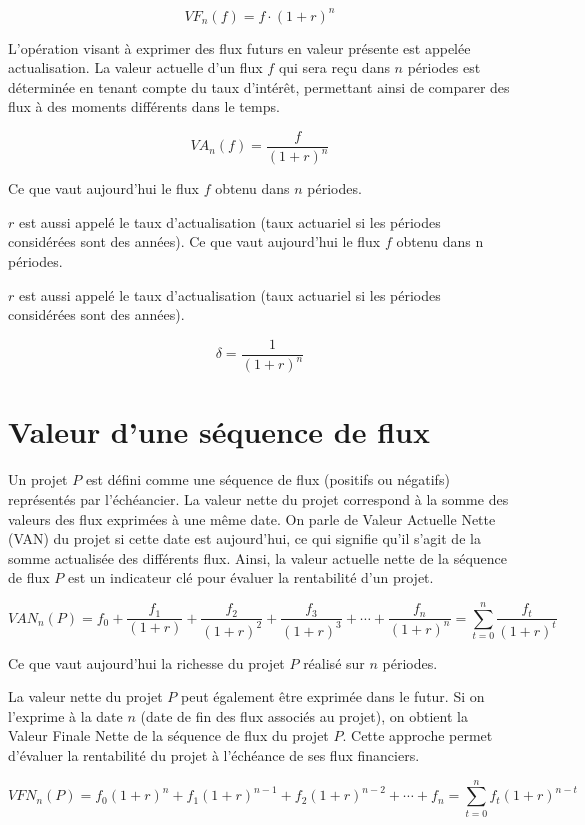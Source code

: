 \documentclass[a4paper, 12pt]{report}
\begin{document}
\[ VF_n(f)=f\cdot(1+r)^n \]

L'opération visant à exprimer des flux futurs en valeur présente est appelée actualisation. La valeur actuelle d'un flux \( f \) qui sera reçu dans \( n \) périodes est déterminée en tenant compte du taux d'intérêt, permettant ainsi de comparer des flux à des moments différents dans le temps.

\[ VA_n(f)= \frac{f}{(1+r)^n} \]

Ce que vaut aujourd’hui le flux \( f \) obtenu dans \( n \) périodes.

\( r \) est aussi appelé le taux  d'actualisation (taux actuariel si les périodes considérées sont des années).
Ce que vaut aujourd’hui le flux \( f \) obtenu dans n périodes.

\( r \) est aussi appelé le taux d'actualisation (taux actuariel si les périodes considérées sont des années).

\[ \delta = \frac{1}{(1+r)^n} \]

\section{Valeur d'une séquence de flux}

Un projet \( P \) est défini comme une séquence de flux (positifs ou négatifs) représentés par l'échéancier. La valeur nette du projet correspond à la somme des valeurs des flux exprimées à une même date. On parle de Valeur Actuelle Nette (VAN) du projet si cette date est aujourd'hui, ce qui signifie qu'il s'agit de la somme actualisée des différents flux. Ainsi, la valeur actuelle nette de la séquence de flux \( P \) est un indicateur clé pour évaluer la rentabilité d'un projet.

\[ VAN_n(P)=f_0+\frac{f_1}{(1+r)}+\frac{f_2}{(1+r)^2}+\frac{f_3}{(1+r)^3}+\cdots+\frac{f_n}{(1+r)^n} = \sum_{t=0}^{n}\frac{f_t}{(1+r)^t}\]

Ce que vaut aujourd'hui la richesse du projet \( P \) réalisé sur \( n \) périodes.

La valeur nette du projet \( P \) peut également être exprimée dans le futur. Si on l'exprime à la date \( n \) (date de fin des flux associés au projet), on obtient la Valeur Finale Nette de la séquence de flux du projet \( P \). Cette approche permet d'évaluer la rentabilité du projet à l'échéance de ses flux financiers.

\[ VFN_n(P)=f_0(1+r)^n+f_1(1+r)^{n-1}+f_2(1+r)^{n-2} + \cdots + f_n = \sum_{t=0}^{n}f_t(1+r)^{n-t}\]
\end{document}
